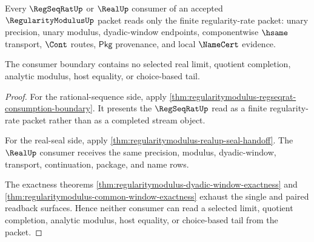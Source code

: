 \begin{theorem}
\label{thm:regularitymodulus-regseqrat-real-consumer-obligations}
Every $\RegSeqRatUp$ or $\RealUp$ consumer of an accepted
$\RegularityModulusUp$ packet reads only the finite regularity-rate packet:
unary precision, unary modulus, dyadic-window endpoints, componentwise
$\hsame$ transport, $\Cont$ routes, $\mathsf{Pkg}$ provenance, and local
$\NameCert$ evidence.

The consumer boundary contains no selected real limit, quotient completion,
analytic modulus, host equality, or choice-based tail.
\end{theorem}
\begin{proof}
For the rational-sequence side, apply
\autoref{thm:regularitymodulus-regseqrat-consumption-boundary}. It presents
the $\RegSeqRatUp$ read as a finite regularity-rate packet rather than as a
completed stream object.

For the real-seal side, apply
\autoref{thm:regularitymodulus-realup-seal-handoff}. The $\RealUp$ consumer
receives the same precision, modulus, dyadic-window, transport,
continuation, package, and name rows.

The exactness theorems
\autoref{thm:regularitymodulus-dyadic-window-exactness} and
\autoref{thm:regularitymodulus-common-window-exactness} exhaust the single
and paired readback surfaces. Hence neither consumer can read a selected
limit, quotient completion, analytic modulus, host equality, or
choice-based tail from the packet.
\end{proof}

